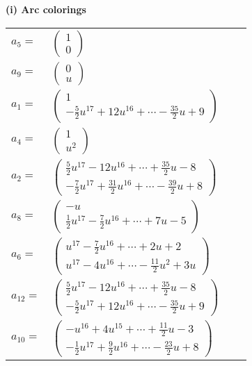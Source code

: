 \documentclass[1p]{elsarticle_modified}
\theoremstyle{definition}
\begin{document}
\flushleft \textbf{(i) Arc colorings}\\
\begin{tabular}{m{7pt} m{180pt} m{7pt} m{180pt} }
\flushright $a_{5}=$&$\begin{pmatrix}1\\0\end{pmatrix}$ \\
\flushright $a_{9}=$&$\begin{pmatrix}0\\u\end{pmatrix}$ \\
\flushright $a_{1}=$&$\begin{pmatrix}1\\-\frac{5}{2} u^{17}+12 u^{16}+\cdots-\frac{35}{2} u+9\end{pmatrix}$ \\
\flushright $a_{4}=$&$\begin{pmatrix}1\\u^2\end{pmatrix}$ \\
\flushright $a_{2}=$&$\begin{pmatrix}\frac{5}{2} u^{17}-12 u^{16}+\cdots+\frac{35}{2} u-8\\-\frac{7}{2} u^{17}+\frac{31}{2} u^{16}+\cdots-\frac{39}{2} u+8\end{pmatrix}$ \\
\flushright $a_{8}=$&$\begin{pmatrix}- u\\\frac{1}{2} u^{17}-\frac{7}{2} u^{16}+\cdots+7 u-5\end{pmatrix}$ \\
\flushright $a_{6}=$&$\begin{pmatrix}u^{17}-\frac{7}{2} u^{16}+\cdots+2 u+2\\u^{17}-4 u^{16}+\cdots-\frac{11}{2} u^2+3 u\end{pmatrix}$ \\
\flushright $a_{12}=$&$\begin{pmatrix}\frac{5}{2} u^{17}-12 u^{16}+\cdots+\frac{35}{2} u-8\\-\frac{5}{2} u^{17}+12 u^{16}+\cdots-\frac{35}{2} u+9\end{pmatrix}$ \\
\flushright $a_{10}=$&$\begin{pmatrix}- u^{16}+4 u^{15}+\cdots+\frac{11}{2} u-3\\-\frac{1}{2} u^{17}+\frac{9}{2} u^{16}+\cdots-\frac{23}{2} u+8\end{pmatrix}$ \\

\end{tabular}
\end{document}
